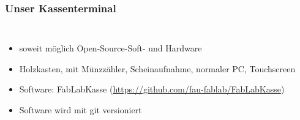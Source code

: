 \documentclass[german]{beamer} %
\newcommand{\images}{kassenterminal/}
\begin{document}
\begin{frame}
\frametitle{Unser Kassenterminal}
\begin{columns}[c]
 \begin{itemize}
 \item soweit möglich Open-Source-Soft- und Hardware
 \item Holzkasten, mit Münzzähler, Scheinaufnahme, normaler PC, Touchscreen
 \item Software: FabLabKasse (\url{https://github.com/fau-fablab/FabLabKasse})
 \item Software wird mit git versioniert
 \end{itemize}
 \end{columns}
\end{frame}
\end{document}
